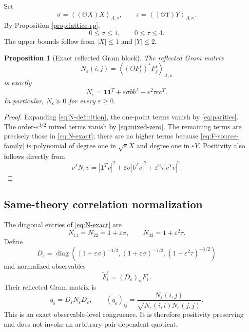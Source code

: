\documentclass[11pt]{article}
\newtheorem{proposition}[theorem]{Proposition}
\newcommand{\one}{\mathbf 1}
\newcommand{\eps}{\varepsilon}
\newcommand{\diag}{\operatorname{diag}}
\begin{document}
Set
\begin{equation}
  \sigma
  =\left\langle(\Theta X)X\right\rangle_{\Lambda,\kappa},
  \qquad
  \tau
  =\left\langle(\Theta Y)Y\right\rangle_{\Lambda,\kappa}.
  \label{eq:sigma-tau}
\end{equation}
By Proposition \ref{prop:lattice-rp},
\begin{equation}
  0\le\sigma\le1,
  \qquad
  0\le\tau\le4.
  \label{eq:sigma-tau-bounds}
\end{equation}
The upper bounds follow from $|X|\le1$ and $|Y|\le2$.

\begin{proposition}[Exact reflected Gram block]
\label{prop:exact-N}
The reflected Gram matrix
\begin{equation}
  N_\eps(i,j)
  =\left\langle(\Theta F_i^\eps)^*F_j^\eps\right\rangle_{\Lambda,\kappa}
  \label{eq:N-definition}
\end{equation}
is exactly
\begin{equation}
  N_\eps
  =\one\one^T+\eps\sigma bb^T+\eps^2\tau cc^T.
  \label{eq:N-exact}
\end{equation}
In particular, $N_\eps\succeq0$ for every $\eps\ge0$.
\end{proposition}

\begin{proof}
Expanding \eqref{eq:N-definition}, the one-point terms vanish by \eqref{eq:parities}.  The order-$\eps^{3/2}$ mixed terms vanish by \eqref{eq:mixed-zero}.  The remaining terms are precisely those in \eqref{eq:N-exact}; there are no higher terms because \eqref{eq:F-source-family} is polynomial of degree one in $\sqrt\eps X$ and degree one in $\eps Y$.  Positivity also follows directly from
\[
  v^TN_\eps v
  =|\one^Tv|^2+\eps\sigma|b^Tv|^2+\eps^2\tau|c^Tv|^2.
\]
\end{proof}

\subsection{Same-theory correlation normalization}

The diagonal entries of \eqref{eq:N-exact} are
\begin{equation}
  N_{11}=N_{22}=1+\eps\sigma,
  \qquad
  N_{33}=1+\eps^2\tau.
  \label{eq:N-diagonal}
\end{equation}
Define
\begin{equation}
  D_\eps
  =\diag\left(
  (1+\eps\sigma)^{-1/2},
  (1+\eps\sigma)^{-1/2},
  (1+\eps^2\tau)^{-1/2}
  \right)
  \label{eq:D-normalization}
\end{equation}
and normalized observables
\begin{equation}
  \widetilde F_i^\eps=(D_\eps)_{ii}F_i^\eps.
  \label{eq:normalized-observables}
\end{equation}
Their reflected Gram matrix is
\begin{equation}
  q_\eps=D_\eps N_\eps D_\eps,
  \qquad
  (q_\eps)_{ij}
  =\frac{N_\eps(i,j)}{\sqrt{N_\eps(i,i)N_\eps(j,j)}}.
  \label{eq:q-congruence}
\end{equation}
This is an exact observable-level congruence.  It is therefore positivity preserving and does not invoke an arbitrary pair-dependent quotient.
\end{document}
